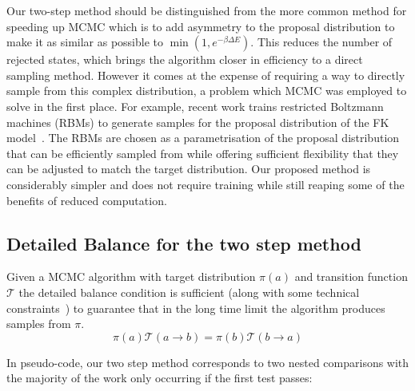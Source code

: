 Our two-step method should be distinguished from the more common method for speeding up MCMC which is to add asymmetry to the proposal distribution to make it as similar as possible to \(\min\left(1, e^{-\beta \Delta E}\right)\). This reduces the number of rejected states, which brings the algorithm closer in efficiency to a direct sampling method. However it comes at the expense of requiring a way to directly sample from this complex distribution, a problem which MCMC was employed to solve in the first place. For example, recent work trains restricted Boltzmann machines (RBMs) to generate samples for the proposal distribution of the FK model~\autocite{huangAcceleratedMonteCarlo2017}. The RBMs are chosen as a parametrisation of the proposal distribution that can be efficiently sampled from while offering sufficient flexibility that they can be adjusted to match the target distribution. Our proposed method is considerably simpler and does not require training while still reaping some of the benefits of reduced computation.

\hypertarget{detailed-balance-for-the-two-step-method}{%
\subsection{Detailed Balance for the two step method}\label{detailed-balance-for-the-two-step-method}}

Given a MCMC algorithm with target distribution \(\pi(a)\) and transition function \(\mathcal{T}\) the detailed balance condition is sufficient (along with some technical constraints~\autocite{wolffMonteCarloErrors2004}) to guarantee that in the long time limit the algorithm produces samples from \(\pi\). \[\pi(a)\mathcal{T}(a \to b) = \pi(b)\mathcal{T}(b \to a)\]

In pseudo-code, our two step method corresponds to two nested comparisons with the majority of the work only occurring if the first test passes:

